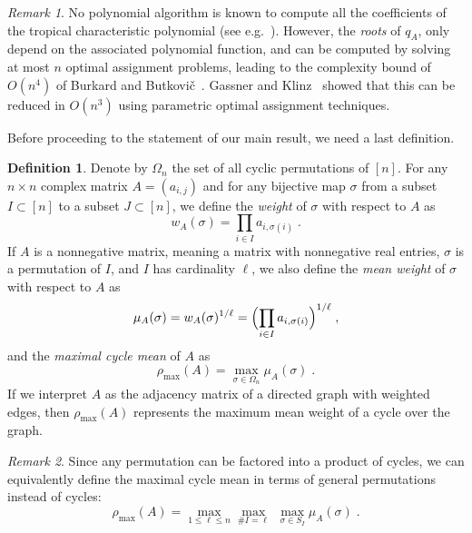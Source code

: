\documentclass[a4paper]{amsart}
\theoremstyle{definition}
\newtheorem{defn}{Definition}
\theoremstyle{plain}
\theoremstyle{remark}
\newtheorem*{rmk*}{Remark}
\begin{document}
\begin{rmk*}
No polynomial algorithm is known to compute all the coefficients of the tropical characteristic polynomial
(see e.g.~\cite{butkoviclewis}).
However, the \emph{roots} of $q_A$, only depend on the associated polynomial function, and can be computed by solving at most $n$ optimal assignment problems,
leading to the complexity bound of $O(n^4)$ of Burkard and Butkovi\v{c}~\cite{burkard-butkovic}. Gassner and Klinz~\cite{gassner} showed
that this can be reduced in $O(n^3)$ using parametric optimal assignment techniques.
\end{rmk*}

Before proceeding to the statement of our main result, we need a last definition. 

\begin{defn}
Denote by $\Omega_n$ the set of all cyclic permutations of $[n]$. 
For any $n \times n$ complex matrix $A = (a_{i,j})$
and for any bijective map $\sigma$ from a subset $I\subset[n]$ to a subset $J\subset[n]$,
we define the \emph{weight} of $\sigma$ with respect to $A$ as
\[
 w_A(\sigma) = \prod_{i\in I} a_{i,\sigma(i)} \;  .
\]
If $A$ is a nonnegative matrix, meaning a matrix with nonnegative real entries,
$\sigma$ is a permutation of $I$, and $I$ has cardinality $\ell$,
 we also define the \emph{mean weight} of $\sigma$ with respect to $A$ as
\[
 \mu_A(\sigma) = w_A(\sigma)^{1/\ell} = \Bigl(\prod_{i\in I} a_{i,\sigma(i)}\Bigr)^{1/\ell} \;  ,
\]
and  the \emph{maximal cycle mean} of $A$ as \[
 \rho_{\max} (A) = \max_{\sigma \in \Omega_n} \mu_A(\sigma) \;  .
\]
If we interpret $A$ as the adjacency matrix of a directed graph with weighted edges,
then $\rho_{\max}(A)$ represents the maximum mean weight of a cycle over the graph.
\end{defn}

\begin{rmk*}
Since any permutation can be factored into a product of cycles,
we can equivalently define the maximal cycle mean
in terms of general permutations instead of cycles:
\[
 \rho_{\max} (A) = \max_{1 {\leqslant} \ell {\leqslant} n} \max_{{\# {I}}=\ell} \;\max_{\sigma \in S_I} \mu_A(\sigma) \;  .
\]
\end{rmk*}
\end{document}
